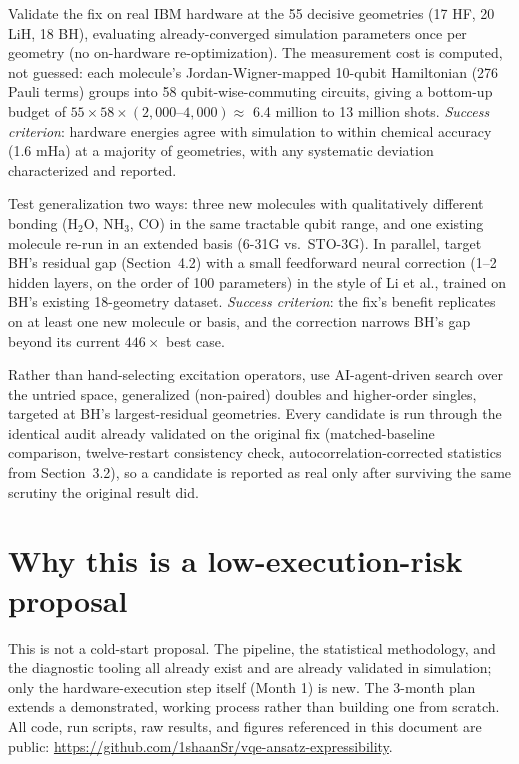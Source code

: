 \documentclass[11pt]{article}
\begin{document}
\begin{description}[leftmargin=0pt, style=nextline]
\item[Month 1, QPU access.] Validate the fix on real IBM hardware at the 55 decisive geometries (17 HF, 20 LiH, 18 BH), evaluating already-converged simulation parameters once per geometry (no on-hardware re-optimization). The measurement cost is computed, not guessed: each molecule's Jordan-Wigner-mapped 10-qubit Hamiltonian (276 Pauli terms) groups into 58 qubit-wise-commuting circuits, giving a bottom-up budget of $55 \times 58 \times (2{,}000\text{--}4{,}000) \approx$ 6.4 million to 13 million shots. \textit{Success criterion}: hardware energies agree with simulation to within chemical accuracy (1.6 mHa) at a majority of geometries, with any systematic deviation characterized and reported.

\item[Month 2, cloud compute.] Test generalization two ways: three new molecules with qualitatively different bonding (H$_2$O, NH$_3$, CO) in the same tractable qubit range, and one existing molecule re-run in an extended basis (6-31G vs.\ STO-3G). In parallel, target BH's residual gap (Section~4.2) with a small feedforward neural correction (1--2 hidden layers, on the order of 100 parameters) in the style of Li et al., trained on BH's existing 18-geometry dataset. \textit{Success criterion}: the fix's benefit replicates on at least one new molecule or basis, and the correction narrows BH's gap beyond its current $446\times$ best case.

\item[Month 3, AI-agent-orchestrated search.] Rather than hand-selecting excitation operators, use AI-agent-driven search over the untried space, generalized (non-paired) doubles and higher-order singles, targeted at BH's largest-residual geometries. Every candidate is run through the identical audit already validated on the original fix (matched-baseline comparison, twelve-restart consistency check, autocorrelation-corrected statistics from Section~3.2), so a candidate is reported as real only after surviving the same scrutiny the original result did.
\end{description}

\section{Why this is a low-execution-risk proposal}
This is not a cold-start proposal. The pipeline, the statistical methodology, and the diagnostic tooling all already exist and are already validated in simulation; only the hardware-execution step itself (Month 1) is new. The 3-month plan extends a demonstrated, working process rather than building one from scratch. All code, run scripts, raw results, and figures referenced in this document are public: \url{https://github.com/1shaanSr/vqe-ansatz-expressibility}.
\end{document}
